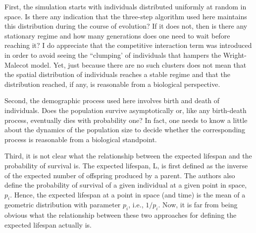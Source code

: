 \begin{point}{}
    First, the simulation starts with individuals distributed uniformly at random in space. Is there any indication that the three-step algorithm used here maintains this distribution during the course of evolution? If it does not, then is there any stationary regime and how many generations does one need to wait before reaching it? I do appreciate that the competitive interaction term was introduced in order to avoid seeing the ``clumping' of individuals that hampers the Wright-Malecot model. Yet, just because there are no such clusters does not mean that the spatial distribution of individuals reaches a stable regime and that the distribution reached, if any, is reasonable from a biological perspective.
\end{point}


Second, the demographic process used here involves birth and death of individuals. Does the population survive asymptotically or, like any birth-death process, eventually dies with probability one? In fact, one needs to know a little about the dynamics of the population size to decide whether the corresponding process is reasonable from a biological standpoint.
\begin{point}{}

\end{point}


\begin{point}{}
    Third, it is not clear what the relationship between the expected lifespan and the probability of survival is. The expected lifespan, L, is first defined as the inverse of the expected number of offspring produced by a parent. The authors also define the probability of survival of a given individual at a given point in space, $p_i$. Hence, the expected lifespan at a point in space (and time) is the mean of a geometric distribution with parameter $p_i$, i.e., $1/p_i$. Now, it is far from being obvious what the relationship between these two approaches for defining the expected lifespan actually is.
\end{point}

